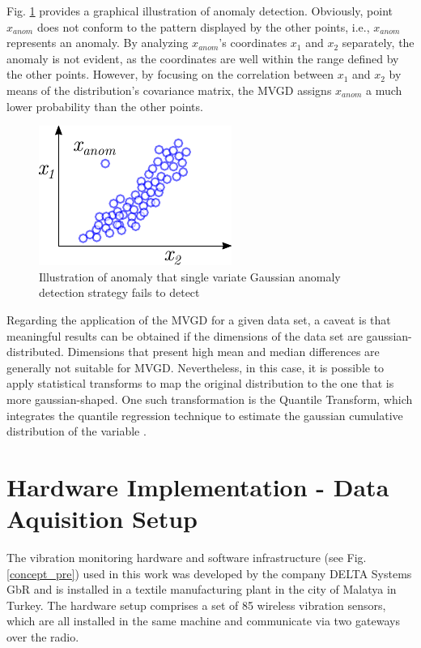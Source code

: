 \documentclass[conference]{IEEEtran}
\begin{document}
Fig. \ref{fig_mvg_singlecaseinnadequade} provides a graphical illustration of anomaly detection. Obviously, point $x_{anom}$ does not conform to the pattern displayed by the other points, i.e., $x_{anom}$ represents an anomaly. By analyzing $x_{anom}$'s coordinates $x_{1}$ and $x_{2}$ separately, the anomaly is not evident, as the coordinates are well within the range defined by the other points. However, by focusing on the correlation between $x_{1}$ and $x_{2}$ by means of the distribution's covariance matrix, the MVGD assigns $x_{anom}$ a much lower probability than the other points.

\begin{figure}[htbp]
\centerline{\includegraphics[width=0.3\columnwidth]{graphics/single_variab_innadequate.pdf}}
\caption{Illustration of anomaly that single variate Gaussian anomaly detection strategy fails to detect}
\label{fig_mvg_singlecaseinnadequade}
\end{figure}

Regarding the application of the MVGD for a given data set, a caveat is that meaningful results can be obtained if the dimensions of the data set are gaussian-distributed. Dimensions that present high mean and median differences are generally not suitable for MVGD. Nevertheless, in this case, it is possible to apply statistical transforms to map the original distribution to the one that is more gaussian-shaped. One such transformation is the Quantile Transform, which integrates the quantile regression technique to estimate the gaussian cumulative distribution of the variable \cite{koenker2001quantile}.


\section{Hardware Implementation - Data Aquisition Setup}
\label{sec_implementation}

The vibration monitoring hardware and software infrastructure (see Fig. \ref{concept_pre}) used in this work was developed by the company DELTA Systems GbR and is installed in a textile manufacturing plant in the city of Malatya in Turkey. The hardware setup comprises a set of 85 wireless vibration sensors, which are all installed in the same machine and communicate via two gateways over the radio.
\end{document}
